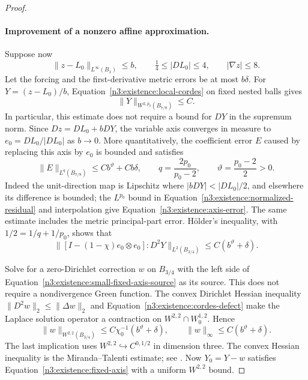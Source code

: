 \begin{proof}
\paragraph{Improvement of a nonzero affine approximation.}
Suppose now
\begin{equation}\label{n3:existence:flat-input}
 \|z-L_0\|_{L^\infty(B_1)}\le b,
 \qquad \tfrac14\le|DL_0|\le4,
 \qquad |\nabla z|\le8.
\end{equation}
Let the forcing and the first-derivative metric errors be at most
$b\delta$.  For $Y=(z-L_0)/b$, Equation~\eqref{n3:existence:local-cordes}
on fixed nested balls gives
\begin{equation}\label{n3:existence:normalized-residual}
 \|Y\|_{W^{2,p_0}(B_{7/8})}\le C.
\end{equation}
In particular, this estimate does not require a bound for
$DY$ in the supremum norm.  Since $Dz=DL_0+bDY$, the variable axis
converges in measure to $e_0=DL_0/|DL_0|$ as $b\to0$.  More
quantitatively, the coefficient error $E$ caused by replacing this
axis by $e_0$ is bounded and satisfies
\begin{equation}\label{n3:existence:axis-error}
 \|E\|_{L^q(B_{7/8})}\le Cb^{\vartheta}+Cb\delta,
 \qquad q=\frac{2p_0}{p_0-2},
 \qquad \vartheta=\frac{p_0-2}{2}>0.
\end{equation}
Indeed the unit-direction map is Lipschitz where
$|bDY|<|DL_0|/2$, and elsewhere its difference is bounded; the
$L^{p_0}$ bound in Equation~\eqref{n3:existence:normalized-residual}
and interpolation give Equation~\eqref{n3:existence:axis-error}.
The same estimate includes the metric principal-part error.
H\"older's inequality, with $1/2=1/q+1/p_0$, shows that
\begin{equation}\label{n3:existence:small-fixed-axis-source}
 \bigl\|[I-(1-\chi)e_0\otimes e_0]:D^2Y\bigr\|_{L^2(B_{3/4})}
 \le C(b^{\vartheta}+\delta).
\end{equation}

Solve for a zero-Dirichlet correction $w$ on $B_{3/4}$ with the
left side of Equation~\eqref{n3:existence:small-fixed-axis-source} as
its source.  This does not require a nondivergence Green function.
The convex Dirichlet Hessian inequality
$\|D^2w\|_2\le\|\Delta w\|_2$ and
Equation~\eqref{n3:existence:cordes-defect} make the Laplace solution
operator a contraction on $W^{2,2}\cap W^{1,2}_0$.  Hence
\begin{equation}\label{n3:existence:fixed-axis-correction}
 \|w\|_{W^{2,2}(B_{3/4})}
 \le C\chi_0^{-1}(b^{\vartheta}+\delta),\qquad
 \|w\|_\infty\le C(b^{\vartheta}+\delta).
\end{equation}
The last implication uses $W^{2,2}\hookrightarrow C^{0,1/2}$ in
dimension three.  The convex Hessian inequality is the
Miranda--Talenti estimate; see \cite[Section~2, Theorem~3]{Talenti1965}.
Now $Y_0=Y-w$ satisfies Equation~\eqref{n3:existence:fixed-axis} with
a uniform $W^{2,2}$ bound.


\end{proof}

